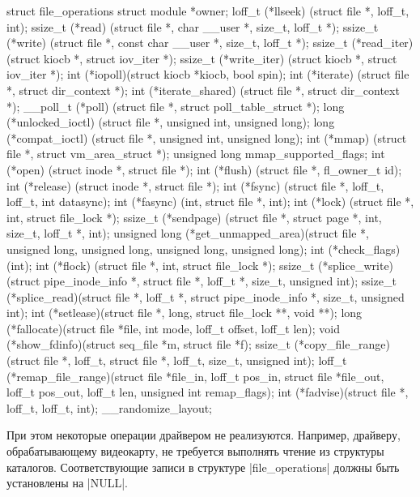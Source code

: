 \documentclass[10pt, oneside]{book}
\begin{document}
\begin{code}
struct file_operations {
    struct module *owner;
    loff_t (*llseek) (struct file *, loff_t, int);
    ssize_t (*read) (struct file *, char __user *, size_t, loff_t *);
    ssize_t (*write) (struct file *, const char __user *, size_t, loff_t *);
    ssize_t (*read_iter) (struct kiocb *, struct iov_iter *);
    ssize_t (*write_iter) (struct kiocb *, struct iov_iter *);
    int (*iopoll)(struct kiocb *kiocb, bool spin);
    int (*iterate) (struct file *, struct dir_context *);
    int (*iterate_shared) (struct file *, struct dir_context *);
    __poll_t (*poll) (struct file *, struct poll_table_struct *);
    long (*unlocked_ioctl) (struct file *, unsigned int, unsigned long);
    long (*compat_ioctl) (struct file *, unsigned int, unsigned long);
    int (*mmap) (struct file *, struct vm_area_struct *);
    unsigned long mmap_supported_flags;
    int (*open) (struct inode *, struct file *);
    int (*flush) (struct file *, fl_owner_t id);
    int (*release) (struct inode *, struct file *);
    int (*fsync) (struct file *, loff_t, loff_t, int datasync);
    int (*fasync) (int, struct file *, int);
    int (*lock) (struct file *, int, struct file_lock *);
    ssize_t (*sendpage) (struct file *, struct page *, int, size_t, loff_t *, int);
    unsigned long (*get_unmapped_area)(struct file *, unsigned long, unsigned long, unsigned long, unsigned long);
    int (*check_flags)(int);
    int (*flock) (struct file *, int, struct file_lock *);
    ssize_t (*splice_write)(struct pipe_inode_info *, struct file *, loff_t *, size_t, unsigned int);
    ssize_t (*splice_read)(struct file *, loff_t *, struct pipe_inode_info *, size_t, unsigned int);
    int (*setlease)(struct file *, long, struct file_lock **, void **);
    long (*fallocate)(struct file *file, int mode, loff_t offset,
        loff_t len);
    void (*show_fdinfo)(struct seq_file *m, struct file *f);
    ssize_t (*copy_file_range)(struct file *, loff_t, struct file *,
        loff_t, size_t, unsigned int);
    loff_t (*remap_file_range)(struct file *file_in, loff_t pos_in,
             struct file *file_out, loff_t pos_out,
             loff_t len, unsigned int remap_flags);
    int (*fadvise)(struct file *, loff_t, loff_t, int);
} __randomize_layout;
\end{code}

При этом некоторые операции драйвером не реализуются.
Например, драйверу, обрабатывающему видеокарту, не требуется выполнять чтение из структуры каталогов. Соответствующие записи в структуре \cpp|file_operations| должны быть установлены на \cpp|NULL|.
\end{document}
